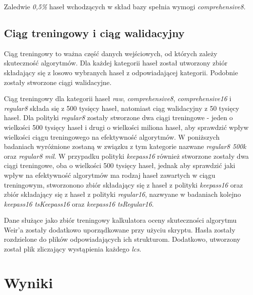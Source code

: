 \documentclass{article}
\begin{document}
	Zaledwie \textit{0,5\%} haseł wchodzących w skład bazy spełnia wymogi \textit{comprehensive8}.
	
	
	\subsection{Ciąg treningowy i ciąg walidacyjny}
	Ciąg treningowy to ważna część danych wejściowych, od których zależy skuteczność algorytmów.
	Dla każdej kategorii haseł został utworzony zbiór składający się z losowo wybranych haseł z odpowiadającej kategorii.
	Podobnie zostały stworzone ciągi walidacyjne. %

	Ciąg treningowy dla kategorii haseł \textit{raw}, \textit{comprehensive8}, \textit{comprehensive16} i \textit{regular8}
	składa się z 500 tysięcy haseł, natomiast ciąg walidacyjny z 50 tysięcy haseł.
	Dla polityki \textit{regular8} zostały stworzone dwa ciągi treningowe - jeden o wielkości 500 tysięcy haseł
	i drugi o wielkości miliona haseł, aby sprawdzić wpływ wielkości ciągu treningowego na efektywność algorytmów.
	W poniższych badaniach wyróżnione zostaną w związku z tym kategorie nazwane \textit{regular8 500k} oraz \textit{regular8 mil}.
	W przypadku polityki \textit{keepass16} również stworzone zostały dwa ciągi treningowe, oba o wielkości 500 tysięcy haseł,
	jednak aby sprawdzić jaki wpływ na efektywność algorytmów ma rodzaj haseł zawartych w ciągu treningowym, stworzonono
	zbiór składający się
	z haseł z polityki \textit{keepass16} oraz zbiór składający się z haseł z polityki \textit{regular16}, nazwyane w badaniach
	kolejno \textit{keepass16 tsKeepass16} oraz \textit{keepass16 tsRegular16}.
	
	Dane służące jako zbiór treningowy kalkulatora oceny skuteczności algorytmu Weir'a zostały dodatkowo uporządkowane przy użyciu skryptu. Hasła zostały rozdzielone do plików odpowiadających ich strukturom. Dodatkowo, utworzony został plik zliczający wystąpienia każdego \textit{lcs}.
	

	\section{Wyniki}
\end{document}
